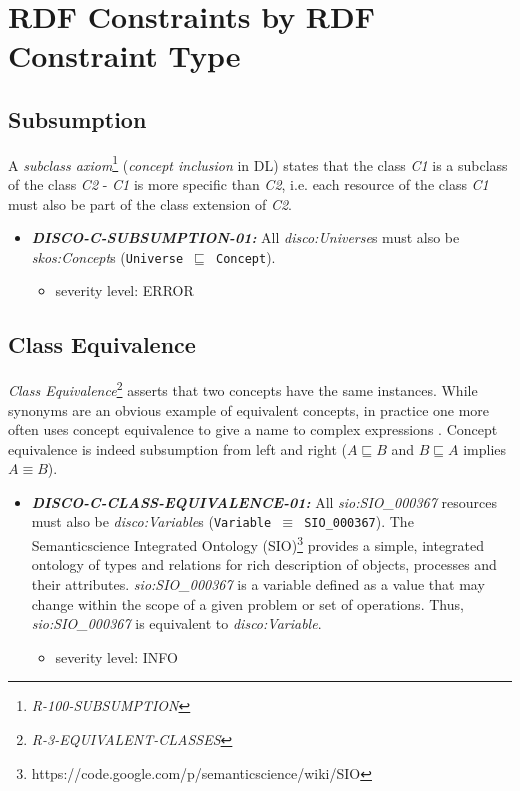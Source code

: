 \documentclass{llncs}
\newcommand{\ms}[1]{\texttt{#1}}
\begin{document}
\section{RDF Constraints by RDF Constraint Type}

\subsection{Subsumption}

A \emph{subclass axiom}\footnote{{\em R-100-SUBSUMPTION}} ({\em concept inclusion} in DL) states that the class \emph{C1} is a subclass of the class \emph{C2} - \emph{C1} is more specific than \emph{C2}, 
i.e. each resource of the class \emph{C1} must also be part of the class extension of \emph{C2}.

\begin{itemize}
	\item \textbf{{\em DISCO-C-SUBSUMPTION-01:}} 
All {\em disco:Universe}s must also be {\em skos:Concept}s (\ms{Universe $\sqsubseteq$ Concept}).
	\begin{itemize}
		\item severity level: ERROR
	\end{itemize}
\end{itemize}

\subsection{Class Equivalence}

{\em Class Equivalence}\footnote{{\em R-3-EQUIVALENT-CLASSES}} asserts that two concepts have the same instances.
While synonyms are an obvious example of equivalent concepts, in practice one more
often uses concept equivalence to give a name to complex expressions \cite{Kroetzsch2012}.
Concept equivalence is indeed subsumption from left and right ($A \sqsubseteq B$ and $B \sqsubseteq A$ implies $A \equiv B$).

\begin{itemize}
	\item \textbf{{\em DISCO-C-CLASS-EQUIVALENCE-01:}}
All {\em sio:SIO\_000367} resources must also be {\em disco:Variable}s (\ms{Variable $\equiv$ SIO\_000367}).
The Semanticscience Integrated Ontology (SIO)\footnote{https://code.google.com/p/semanticscience/wiki/SIO} provides a simple, integrated ontology of types and relations for rich description of objects, processes and their attributes.
{\em sio:SIO\_000367} is a variable defined as a value that may change within the scope of a given problem or set of operations.
Thus, {\em sio:SIO\_000367} is equivalent to {\em disco:Variable}.
\begin{itemize}
	\item severity level: INFO
\end{itemize}
\end{itemize}
\end{document}
